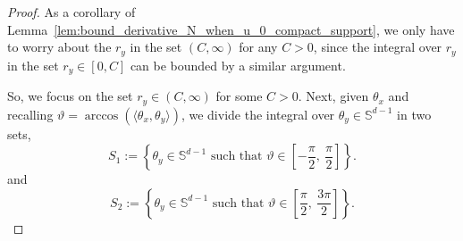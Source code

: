 \documentclass[12pt,longbibliography]{article}
\def\S{\mathbb{S}}
\theoremstyle{definition}
\theoremstyle{remark}
\theoremstyle{example}
\begin{document}
\begin{proof}
	
	
	As a corollary of Lemma~\ref{lem:bound_derivative_N_when_u_0_compact_support}, we only have to worry about the $r_y$ in the set $(C, \infty)$ for any $C>0$, since the integral over $r_y$ in the set $r_y\in[0, C]$ can be bounded by a similar argument.
	
	So, we focus on the set $r_y\in (C, \infty)$ for some $C>0$. Next, given $\theta_x$ and recalling $\vartheta=\arccos(\langle\theta_x, \theta_y\rangle)$, we divide the integral over $\theta_y\in\S^{d-1}$ in two sets,
	\[
	S_1:=\left\{\theta_y\in \S^{d-1}\text{ such that }\vartheta\in \left[-\frac{\pi}{2},\ \frac{\pi}{2}\right] \right\}.
	\]
	and
	\[
	S_2:=\left\{\theta_y\in \S^{d-1}\text{ such that }\vartheta\in \left[\frac{\pi}{2},\ \frac{3\pi}{2}\right] \right\}.
	\]
	

\end{proof}
\end{document}
